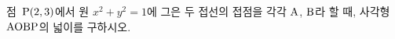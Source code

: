 점~$\mathrm{P}(2{,}\mkern3mu\mathopen{}3)$에서 원 $x^2+y^2=1$에 그은 두 접선의 접점을 각각 $\mathrm{A}$, $\mathrm{B}$라 할 때, 사각형~$\mathrm{AOBP}$의 넓이를 구하시오. 
